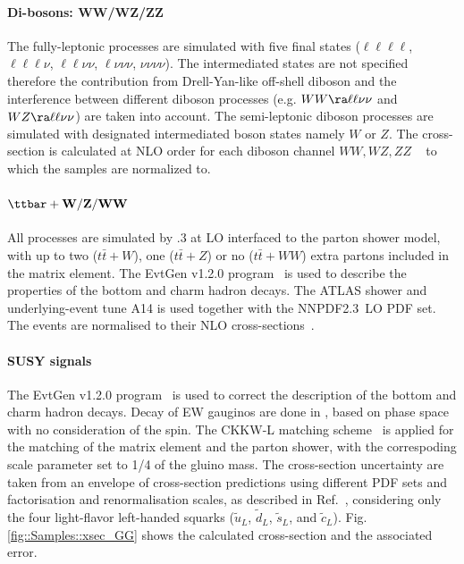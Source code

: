 \paragraph{Di-bosons: WW/WZ/ZZ}
The fully-leptonic processes are simulated with five final states ($\ell\ell\ell\ell$, $\ell\ell\ell\nu$, $\ell\ell\nu\nu$, $\ell\nu\nu\nu$, $\nu\nu\nu\nu$). The intermediated states are not specified therefore the contribution from Drell-Yan-like off-shell diboson and the interference between different diboson processes (e.g. $WW\ra\ell\ell\nu\nu$ and $WZ\ra\ell\ell\nu\nu$) are taken into account. The semi-leptonic diboson processes are simulated with designated intermediated boson states namely $W$ or $Z$.
The cross-section is calculated at NLO order for each diboson channel $WW,WZ,ZZ$ ~ to which the samples are normalized to.


\paragraph{${\bf \ttbar+W/Z/WW}$}
All processes are simulated by .3 at LO interfaced to the  parton shower model, 
with up to two ($t\bar{t}+W$), one ($t\bar{t}+Z$) or no ($t\bar{t}+WW$) extra partons included in the matrix element. 
The EvtGen v1.2.0 program~\cite{EvtGen} is used to describe the properties of the bottom and charm hadron decays. 
The ATLAS shower and underlying-event tune A14 is used together with the NNPDF2.3~LO PDF set. 
The events are normalised to their NLO cross-sections~.


\paragraph{SUSY signals} \label{sec::Samples::SUSY}
The EvtGen v1.2.0 program~\cite{EvtGen} is used to correct the description of the bottom and charm hadron decays. 
Decay of EW gauginos are done in \pythia , based on phase space with no consideration of the spin.
The CKKW-L matching scheme~\cite{CKKW} is applied for the matching of the matrix element and the parton shower, with the correspoding scale parameter set to 1/4 of the gluino mass. 
The cross-section uncertainty are taken from an envelope of cross-section predictions using different PDF sets and factorisation and renormalisation scales, as described in Ref.~\cite{Borschensky:2014cia}, considering only the four light-flavor left-handed squarks ($\tilde{u}_L$, $\tilde{d}_L$, $\tilde{s}_L$, and $\tilde{c}_L$). Fig. \ref{fig::Samples::xsec_GG} shows the calculated cross-section and the associated error. \\

